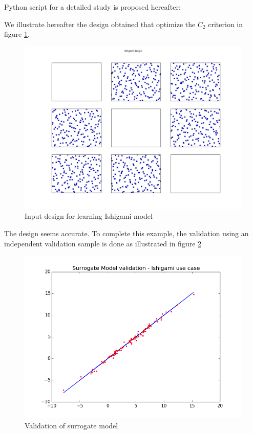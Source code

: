 Python script for a detailed study is proposed hereafter:



We illustrate hereafter the design obtained that optimize the $C_2$ criterion in figure \ref{design_ishigami}.
\begin{figure}[!h]
\label{design_ishigami}
 \begin{center}
  \includegraphics[scale=0.25]{design_ishigami.png}
 \end{center}
 \caption{Input design for learning Ishigami model}
\end{figure}
\newpage The design seems accurate. To complete this example, the validation using an independent validation sample is done as illustrated in figure \ref{ishigami_model_validation}

\begin{figure}[!h]\label{ishigami_model_validation}
 \begin{center}
  \includegraphics[scale=0.35]{ishigami_model_validation.png}
 \end{center}
 \caption{Validation of surrogate model}
\end{figure}
